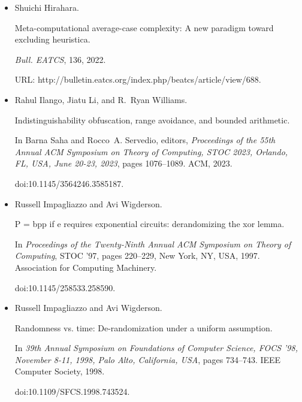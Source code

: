 \documentclass[10pt,a4paper]{article}
\begin{document}
\begin{itemize}
doi:10.4230/LIPICS.APPROX/RANDOM.2022.20.





\item[] 
[13]

Shuichi Hirahara.


Meta-computational average-case complexity: A new paradigm toward
excluding heuristica.


\emph{Bull. EATCS}, 136, 2022.


URL:
http://bulletin.eatcs.org/index.php/beatcs/article/view/688.





\item[] 
[14]

Rahul Ilango, Jiatu Li, and R. Ryan Williams.


Indistinguishability obfuscation, range avoidance, and bounded
arithmetic.


In Barna Saha and Rocco A. Servedio, editors, \emph{Proceedings of the
55th Annual ACM Symposium on Theory of Computing, STOC 2023, Orlando, FL,
USA, June 20-23, 2023}, pages 1076–1089. ACM, 2023.


doi:10.1145/3564246.3585187.





\item[] 
[15]

Russell Impagliazzo and Avi Wigderson.


P = bpp if e requires exponential circuits: derandomizing the xor
lemma.


In \emph{Proceedings of the Twenty-Ninth Annual ACM Symposium on
Theory of Computing}, STOC ’97, pages 220–229, New York, NY, USA, 1997.
Association for Computing Machinery.


doi:10.1145/258533.258590.





\item[] 
[16]

Russell Impagliazzo and Avi Wigderson.


Randomness vs. time: De-randomization under a uniform assumption.


In \emph{39th Annual Symposium on Foundations of Computer Science,
FOCS ’98, November 8-11, 1998, Palo Alto, California, USA}, pages
734–743. IEEE Computer Society, 1998.


doi:10.1109/SFCS.1998.743524.






\end{itemize}
\end{document}
